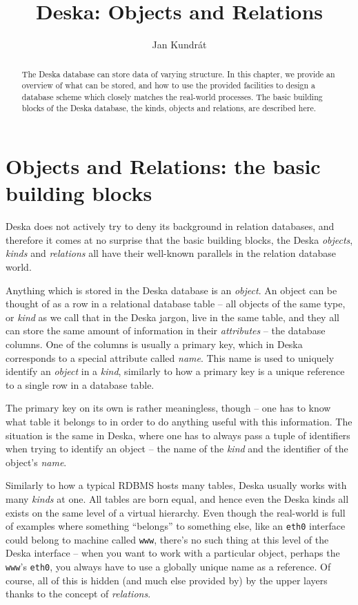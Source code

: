 \documentclass{article}
\begin{document}
\title{Deska: Objects and Relations}

\author{Jan Kundrát}

\maketitle

\newcommand{\deskaFuncRef}[1]{{\tt {#1}}}

\begin{abstract}
The Deska database can store data of varying structure.  In this chapter, we provide an overview of what can be stored,
and how to use the provided facilities to design a database scheme which closely matches the real-world processes.  The
basic building blocks of the Deska database, the kinds, objects and relations, are described here.
\end{abstract}

\section{Objects and Relations: the basic building blocks}

Deska does not actively try to deny its background in relation databases, and therefore it comes at no surprise that the
basic building blocks, the Deska {\em objects}, {\em kinds} and {\em relations} all have their well-known parallels in
the relation database world.

Anything which is stored in the Deska database is an {\em object}. An object can be thought of as a row in a relational
database table -- all objects of the same type, or {\em kind} as we call that in the Deska jargon, live in the same
table, and they all can store the same amount of information in their {\em attributes} -- the database
columns.  One of the columns is usually a primary key, which in Deska corresponds to a special attribute called {\em
name}.  This name is used to uniquely identify an {\em object} in a {\em kind}, similarly to how a primary key is a
unique reference to a single row in a database table.

The primary key on its own is rather meaningless, though -- one has to know what table it belongs to in order to do
anything useful with this information.  The situation is the same in Deska, where one has to always pass a tuple of
identifiers when trying to identify an object -- the name of the {\em kind} and the identifier of the object's {\em
name}.

Similarly to how a typical RDBMS hosts many tables, Deska usually works with many {\em kinds} at one.  All tables are
born equal, and hence even the Deska kinds all exists on the same level of a virtual hierarchy.  Even though the
real-world is full of examples where something ``belongs'' to something else, like an {\tt eth0} interface could belong
to machine called {\tt www}, there's no such thing at this level of the Deska interface -- when you want to work with a
particular object, perhaps the {\tt www}'s {\tt eth0}, you always have to use a globally unique name as a reference.
Of course, all of this is hidden (and much else provided by) by the upper layers thanks to the concept of {\em
relations}.
\end{document}
